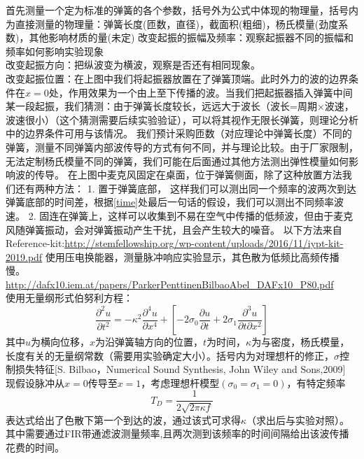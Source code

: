 \documentclass[UTF8,9pt]{report}
\begin{document}
    首先测量一个定为标准的弹簧的各个参数，括号外为公式中体现的物理量，括号内为直接测量的物理量：弹簧长度(匝数，直径)，截面积(粗细)，杨氏模量(劲度系数)，其他影响材质的量(未定)
    改变起振的振幅及频率：观察起振器不同的振幅和频率如何影响实验现象\\
    改变起振方向：把纵波变为横波，观察是否还有相同现象。\\
    改变起振位置：在上图中我们将起振器放置在了弹簧顶端。此时外力的波的边界条件在$x=0$处，作用效果为一个由上至下传播的波。当我们把起振器插入弹簧中间某一段起振，我们猜测：由于弹簧长度较长，远远大于波长（波长=周期$\times$波速，波速很小）（这个猜测需要后续实验验证），可以将其视作无限长弹簧，则理论分析中的边界条件可用与该情况。
    我们预计采购匝数（对应理论中弹簧长度）不同的弹簧，测量不同弹簧内部波传导的方式有何不同，并与理论比较。由于厂家限制，无法定制杨氏模量不同的弹簧，我们可能在后面通过其他方法测出弹性模量如何影响波的传导。
    在上图中麦克风固定在桌面，位于弹簧侧面，除了这种放置方法我们还有两种方法：
    1. 置于弹簧底部， 这样我们可以测出同一个频率的波两次到达弹簧底部的时间差，根据\ref{time}处最后一句话的假设，我们可以测出不同频率波速。
    2. 固连在弹簧上，这样可以收集到不易在空气中传播的低频波，但由于麦克风随弹簧振动，会对弹簧振动产生干扰，且会产生较大的噪音。
以下方法来自Reference-kit:\url{http://stemfellowship.org/wp-content/uploads/2016/11/iypt-kit-2019.pdf}
使用压电换能器，测量脉冲响应实验显示，其色散为低频比高频传播慢。\\
\url{http://dafx10.iem.at/papers/ParkerPenttinenBilbaoAbel_DAFx10_P80.pdf}\\
使用无量纲形式伯努利方程：
$$\frac { \partial ^ { 2 } u } { \partial t ^ { 2 } } = - \kappa ^ { 2 } \frac { \partial ^ { 4 } u } { \partial x^{4}} + \left[-2\sigma _0\frac { \partial u } { \partial t } + 2 \sigma _ { 1 } \frac { \partial ^ { 3 } u } { \partial t \partial x ^ { 2 } } \right]$$
其中$u$为横向位移，$x$为沿弹簧轴方向的位置，$t$为时间，$\kappa$为与密度，杨氏模量，长度有关的无量纲常数（需要用实验确定大小）。括号内为对理想杆的修正，$\sigma$控制损失特征[S. Bilbao，Numerical Sound Synthesis, John Wiley and Sons,2009]\\
现假设脉冲从$x=0$传导至$x=1$，考虑理想杆模型$(\sigma_0=\sigma_1=0)$，有特定频率
$$T _ { D } = \frac { 1 } { 2 \sqrt { 2 \pi \kappa f } }$$
表达式给出了色散下第一个到达的波，通过该式可求得$\kappa$（求出后与实验对照）。\\
其中需要通过FIR带通滤波测量频率,且两次测到该频率的时间间隔给出该波传播花费的时间。
\end{document}
